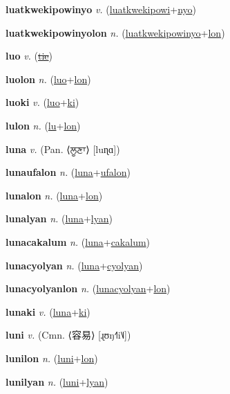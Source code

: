 \textbf{\hypertarget{luatkwekipowinyo}{luatkwekipowinyo}} \textit{v.} (\hyperlink{luatkwekipowi}{luatkwekipowi}+\allowbreak \hyperlink{nyo}{nyo})


\textbf{\hypertarget{luatkwekipowinyolon}{luatkwekipowinyolon}} \textit{n.} (\hyperlink{luatkwekipowinyo}{luatkwekipowinyo}+\allowbreak \hyperlink{lon}{lon})


\textbf{\hypertarget{luo}{luo}} \textit{v.} (\hyperlink{tie}{\sout{tie}})


\textbf{\hypertarget{luolon}{luolon}} \textit{n.} (\hyperlink{luo}{luo}+\allowbreak \hyperlink{lon}{lon})


\textbf{\hypertarget{luoki}{luoki}} \textit{v.} (\hyperlink{luo}{luo}+\allowbreak \hyperlink{ki}{ki})


\textbf{\hypertarget{lulon}{lulon}} \textit{n.} (\hyperlink{lu}{lu}+\allowbreak \hyperlink{lon}{lon})


\textbf{\hypertarget{luna}{luna}} \textit{v.} (Pan. ⟨{\gurmukhi{}ਲੂਣਾ}⟩ [luɳɑ])


\textbf{\hypertarget{lunaufalon}{lunaufalon}} \textit{n.} (\hyperlink{luna}{luna}+\allowbreak \hyperlink{ufalon}{ufalon})


\textbf{\hypertarget{lunalon}{lunalon}} \textit{n.} (\hyperlink{luna}{luna}+\allowbreak \hyperlink{lon}{lon})


\textbf{\hypertarget{lunalyan}{lunalyan}} \textit{n.} (\hyperlink{luna}{luna}+\allowbreak \hyperlink{lyan}{lyan})


\textbf{\hypertarget{lunacakalum}{lunacakalum}} \textit{n.} (\hyperlink{luna}{luna}+\allowbreak \hyperlink{cakalum}{cakalum})


\textbf{\hypertarget{lunacyolyan}{lunacyolyan}} \textit{n.} (\hyperlink{luna}{luna}+\allowbreak \hyperlink{cyolyan}{cyolyan})


\textbf{\hypertarget{lunacyolyanlon}{lunacyolyanlon}} \textit{n.} (\hyperlink{lunacyolyan}{lunacyolyan}+\allowbreak \hyperlink{lon}{lon})


\textbf{\hypertarget{lunaki}{lunaki}} \textit{v.} (\hyperlink{luna}{luna}+\allowbreak \hyperlink{ki}{ki})


\textbf{\hypertarget{luni}{luni}} \textit{v.} (Cmn. ⟨{\chinese{}容易}⟩ [ɻʊŋ˧˥i˥˩])


\textbf{\hypertarget{lunilon}{lunilon}} \textit{n.} (\hyperlink{luni}{luni}+\allowbreak \hyperlink{lon}{lon})


\textbf{\hypertarget{lunilyan}{lunilyan}} \textit{n.} (\hyperlink{luni}{luni}+\allowbreak \hyperlink{lyan}{lyan})


